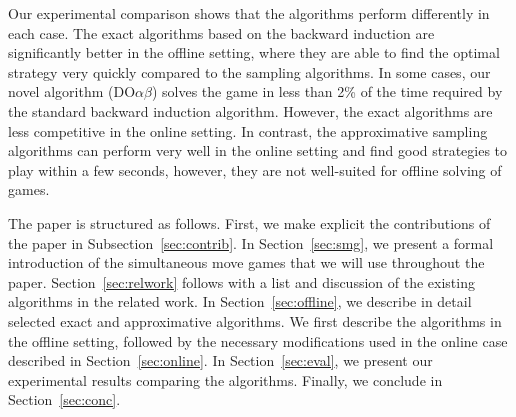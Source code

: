 \documentclass[preprint,12pt]{elsarticle}
\newcommand{\reviewchange}[1]{{\color{black}#1}}
\newcommand{\doab}[0]{\textrm{DO}\alpha\beta}
\begin{document}
Our experimental comparison shows that the algorithms perform differently in each case.
\reviewchange{The exact algorithms based on the backward induction are significantly better in the offline setting,
where they are able to find the optimal strategy very quickly compared to the sampling algorithms.}
In some cases, our novel algorithm ($\doab$) solves the game in less than 2\% of the time required by the standard backward induction algorithm.
However, the exact algorithms are less competitive in the online setting.
In contrast, the approximative sampling algorithms can perform very well in the online setting and
find good strategies to play within a few seconds, however, they are not well-suited for offline solving of games.

The paper is structured as follows. \reviewchange{First, we make explicit the contributions of the paper in Subsection~\ref{sec:contrib}.}
In Section~\ref{sec:smg}, we present a formal introduction of the simultaneous move games that we will use throughout the paper.
Section~\ref{sec:relwork} follows with a list and discussion of the existing algorithms in the related work. In
Section~\ref{sec:offline}, we describe in detail selected exact and approximative algorithms.
We first describe the algorithms in the offline setting, followed by the necessary modifications used in the online
case described in Section~\ref{sec:online}.
In Section~\ref{sec:eval}, we present our experimental results comparing the algorithms.
Finally, we conclude in Section~\ref{sec:conc}.
\end{document}
